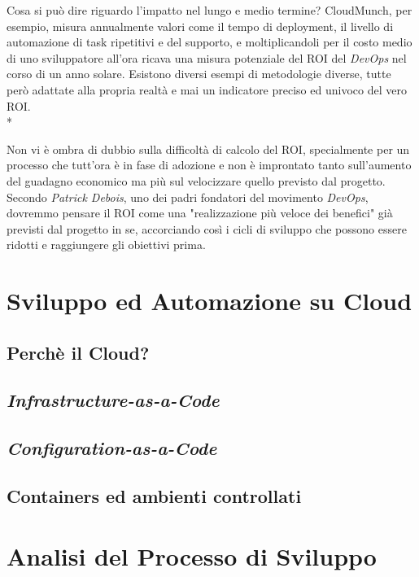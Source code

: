 \documentclass[a4paper,12pt]{report}
\begin{document}
			    Cosa si può dire riguardo l'impatto nel lungo e medio termine? CloudMunch, per esempio, misura annualmente valori come il tempo di deployment, il livello di automazione di task ripetitivi e del supporto, e moltiplicandoli per il costo medio di uno sviluppatore all'ora ricava una misura potenziale del ROI del \emph{DevOps} nel corso di un anno solare. Esistono diversi esempi di metodologie diverse, tutte però adattate alla propria realtà e mai un indicatore preciso ed univoco del vero ROI.\\*
			    
			    Non vi è ombra di dubbio sulla difficoltà di calcolo del ROI, specialmente per un processo che tutt'ora è in fase di adozione e non è improntato tanto sull'aumento del guadagno economico ma più sul velocizzare quello previsto dal progetto. Secondo \emph{Patrick Debois}, uno dei padri fondatori del movimento \emph{DevOps}, dovremmo pensare il ROI come una "realizzazione più veloce dei benefici" già previsti dal progetto in se, accorciando così i cicli di sviluppo che possono essere ridotti e raggiungere gli obiettivi prima.
	
	\chapter{Sviluppo ed Automazione su Cloud}
	
	\section{Perchè il Cloud?}
	
	\section{\emph{Infrastructure-as-a-Code}}
	
	\section{\emph{Configuration-as-a-Code}}
	
	\section{Containers ed ambienti controllati}
	
	\chapter{Analisi del Processo di Sviluppo}
	
\end{document}
